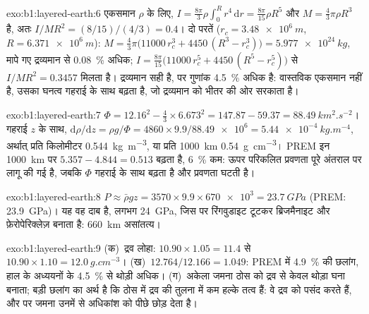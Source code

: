 \begin{solution}{exo:b1:layered-earth:6}
एकसमान $\rho$ के लिए, $I = \tfrac{8\pi}{3}\rho\int_0^R r^4\,\mathrm dr =
\tfrac{8\pi}{15}\rho R^5$ और $M = \tfrac43\pi\rho R^3$ है, अतः
$I/MR^2 = (8/15)/(4/3) = 0.4$। दो परतें ($r_c = \qty{3.48e6}{m}$,
$R = \qty{6.371e6}{m}$): $M = \tfrac43\pi\bigl(11000\,r_c^3 + 4450\,(R^3 -
r_c^3)\bigr) = \qty{5.977e24}{kg}$, मापे गए द्रव्यमान से \qty{0.08}{\percent} अधिक; $I = \tfrac{8\pi}{15}\bigl(11000\,r_c^5 + 4450\,(R^5 - r_c^5)\bigr)$
से $I/MR^2 = 0.3457$ मिलता है। द्रव्यमान सही है, पर गुणांक \qty{4.5}{\percent} अधिक है: वास्तविक  एकसमान नहीं है,
उसका घनत्व गहराई के साथ बढ़ता है, जो द्रव्यमान को भीतर की ओर सरकाता है।
\end{solution}

\begin{solution}{exo:b1:layered-earth:7}
$\Phi = 12.16^2 - \tfrac43\times6.673^2 = 147.87 - 59.37 =
\qty{88.49}{km^2.s^{-2}}$। गहराई $z$ के साथ,
$\mathrm d\rho/\mathrm dz = \rho g/\Phi = 4860\times9.9/\num{88.49e6} =
\qty{5.44e-4}{kg.m^{-4}}$, अर्थात् प्रति किलोमीटर \qty{0.544}{kg.m^{-3}}, या प्रति \qty{1000}{km} \qty{0.54}{g.cm^{-3}}। PREM इन
\qty{1000}{km} पर $5.357 - 4.844 =
0.513$ बढ़ता है, \qty{6}{\percent} कम: ऊपर परिकलित प्रवणता पूरे अंतराल पर लागू की गई है, जबकि $\Phi$ गहराई के साथ
बढ़ता है और प्रवणता घटती है।
\end{solution}

\begin{solution}{exo:b1:layered-earth:8}
$P \approx \bar\rho g z = 3570\times9.9\times\num{670e3} = \qty{23.7}{GPa}$
(PREM: \qty{23.9}{GPa})। यह वह दाब है, लगभग \qty{24}{GPa}, जिस पर रिंगवुडाइट टूटकर ब्रिजमैनाइट और फ़ेरोपेरिक्लेज़ बनाता है:
\qty{660}{km} असांतत्य।
\end{solution}

\begin{solution}{exo:b1:layered-earth:9}
(क)~द्रव लोहा: $10.90\times1.05 = 11.4$ से $10.90\times1.10 =
\qty{12.0}{g.cm^{-3}}$। (ख)~$12.764/12.166 = 1.049$: PREM में \qty{4.9}{\percent} की छलांग, हाल के अध्ययनों के
\qty{4.5}{\percent} से थोड़ी अधिक। (ग)~अकेला जमना ठोस को द्रव से केवल थोड़ा घना बनाता; बड़ी छलांग का अर्थ है कि ठोस
में द्रव की तुलना में कम हल्के तत्व हैं: वे द्रव को पसंद करते हैं, और  पर जमना उनमें से अधिकांश को पीछे छोड़ देता है।
\end{solution}

